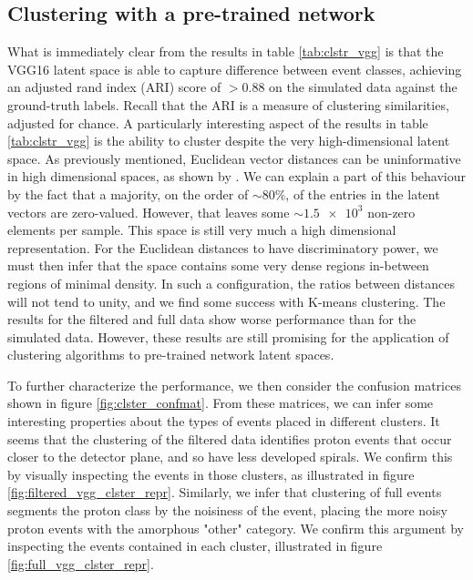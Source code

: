 \subsection{Clustering with a pre-trained network}

What is immediately clear from the results in table \ref{tab:clstr_vgg} is that the VGG16 latent space is able to capture difference between event classes, achieving an adjusted rand index (ARI) score of $>0.88$ on the simulated data against the ground-truth labels. Recall that the ARI is a measure of clustering similarities, adjusted for chance. A particularly interesting aspect of the results in table \ref{tab:clstr_vgg} is the ability to cluster despite the very high-dimensional latent space. As previously mentioned, Euclidean vector distances can be uninformative in high dimensional spaces, as shown by \cite{Aggarwal}. We can explain a part of this behaviour by the fact that a majority, on the order of $\sim 80\%$, of the entries in the latent vectors are zero-valued. However, that leaves some $\sim \num{1.5e3}$ non-zero elements per sample. This space is still very much a high dimensional representation. For the Euclidean distances to have discriminatory power, we must then infer that the space contains some very dense regions in-between regions of minimal density. In such a configuration, the ratios between distances will not tend to unity, and we find some success with K-means clustering. The results for the filtered and full data show worse performance than for the simulated data. However, these results are still promising for the application of clustering algorithms to pre-trained network latent spaces.

To further characterize the performance, we then consider the confusion matrices shown in figure \ref{fig:clster_confmat}. From these matrices, we can infer some interesting properties about the types of events placed in different clusters. It seems that the clustering of the filtered data identifies proton events that occur closer to the detector plane, and so have less developed spirals. We confirm this by visually inspecting the events in those clusters, as illustrated in figure \ref{fig:filtered_vgg_clster_repr}. Similarly, we infer that clustering of full events segments the proton class by the noisiness of the event, placing the more noisy proton events with the amorphous "other" category. We confirm this argument by inspecting the events contained in each cluster, illustrated in figure \ref{fig:full_vgg_clster_repr}.

